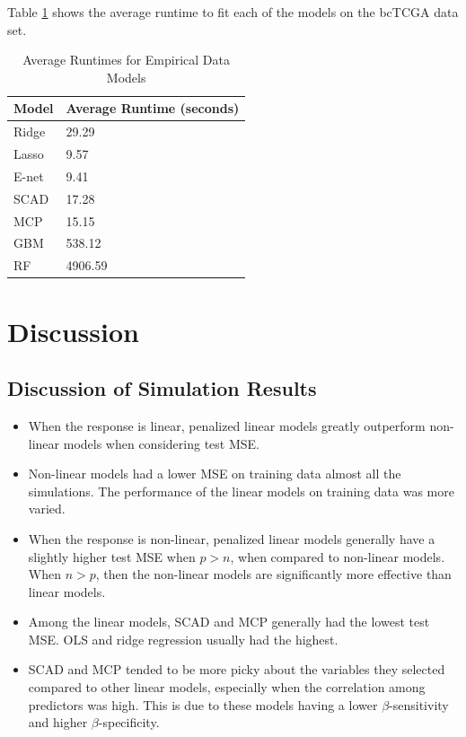 \documentclass{article}
\begin{document}
	Table \ref{tab:emp_runtimes} shows the average runtime to fit each of the models on the bcTCGA data set.
	
	\begin{table}[h!]
		\centering
		\caption{Average Runtimes for Empirical Data Models}
		\label{tab:emp_runtimes}
		\begin{tabular}{ll}
			\hline
			\textbf{Model}        & \textbf{Average Runtime} (seconds) \\ \hline
			Ridge         & 29.29               \\
			Lasso         & 9.57                \\
			E-net	      & 9.41                \\
			SCAD          & 17.28               \\
			MCP           & 15.15               \\
			GBM      	  & 538.12              \\
			RF 			  & 4906.59             \\ \hline
		\end{tabular}
	\end{table}
	
	\newpage
	\section{Discussion}\label{sec:discussion}
	\subsection{Discussion of Simulation Results}
	
	
	\begin{itemize}
		\item When the response is linear, penalized linear models greatly outperform non-linear models when considering test MSE.
		\item Non-linear models had a lower MSE on training data almost all the simulations. The performance of the linear models on training data was more varied.
		\item When the response is non-linear, penalized linear models generally have a slightly higher test MSE when $p > n$, when compared to non-linear models. When $n > p$, then the non-linear models are significantly more effective than linear models.
		\item Among the linear models, SCAD and MCP generally had the lowest test MSE. OLS and ridge regression usually had the highest.
		\item SCAD and MCP tended to be more picky about the variables they selected compared to other linear models, especially when the correlation among predictors was high. This is due to these models having a lower $\beta$-sensitivity and higher $\beta$-specificity.
	\end{itemize}
	
\end{document}
